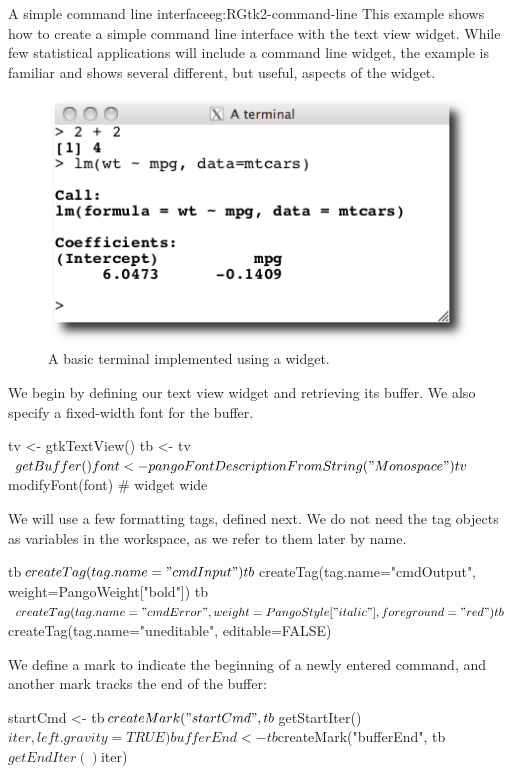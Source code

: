 \begin{example}{A simple command line interface}{eg:RGtk2-command-line}
This example shows how to create a simple command line interface with
the text view widget. While few statistical applications will include
a command line widget, the example is familiar and shows several
different, but useful, aspects of the widget.

\begin{figure}
  \centering
  \includegraphics[width=.6\textwidth]{ex-RGtk2-terminal}
  \caption{A basic \R\/ terminal implemented using a  widget.}
  \label{fig:RGtk2-terminal}
\end{figure}


We begin by defining our text view widget and retrieving its
buffer. We also specify a fixed-width font for the buffer.
\begin{Schunk}
\begin{Sinput}
 tv <- gtkTextView()
 tb <- tv$getBuffer()
 font <- pangoFontDescriptionFromString("Monospace")
 tv$modifyFont(font)                     # widget wide
\end{Sinput}
\end{Schunk}

We will use a few formatting tags, defined next. We do not need the
tag objects as variables in the workspace, as we refer to them later
by name.
\begin{Schunk}
\begin{Sinput}
 tb$createTag(tag.name="cmdInput")
 tb$createTag(tag.name="cmdOutput", 
              weight=PangoWeight["bold"])
 tb$createTag(tag.name="cmdError", 
              weight=PangoStyle["italic"], foreground="red")
 tb$createTag(tag.name="uneditable", editable=FALSE)
\end{Sinput}
\end{Schunk}

We define a mark to indicate the beginning of a newly entered
command, and another mark tracks the end of the buffer:
\begin{Schunk}
\begin{Sinput}
 startCmd <- tb$createMark("startCmd", tb$getStartIter()$iter, 
                           left.gravity=TRUE)
 bufferEnd <- tb$createMark("bufferEnd", tb$getEndIter()$iter)
\end{Sinput}
\end{Schunk}



\end{example}
